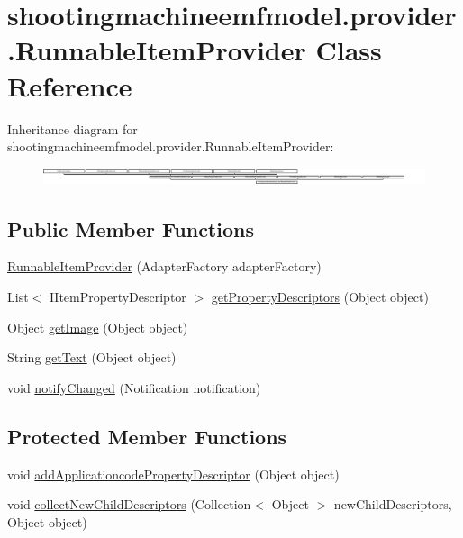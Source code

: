 \hypertarget{classshootingmachineemfmodel_1_1provider_1_1_runnable_item_provider}{\section{shootingmachineemfmodel.\-provider.\-Runnable\-Item\-Provider Class Reference}
\label{classshootingmachineemfmodel_1_1provider_1_1_runnable_item_provider}
}
Inheritance diagram for shootingmachineemfmodel.\-provider.\-Runnable\-Item\-Provider\-:\begin{figure}[H]
\begin{center}
\leavevmode
\includegraphics[height=0.499109cm]{classshootingmachineemfmodel_1_1provider_1_1_runnable_item_provider}
\end{center}
\end{figure}
\subsection*{Public Member Functions}
\begin{DoxyCompactItemize}
\item 
\hyperlink{classshootingmachineemfmodel_1_1provider_1_1_runnable_item_provider_a274fa6890fac2df2d340ad5b0453d7a5}{Runnable\-Item\-Provider} (Adapter\-Factory adapter\-Factory)
\item 
List$<$ I\-Item\-Property\-Descriptor $>$ \hyperlink{classshootingmachineemfmodel_1_1provider_1_1_runnable_item_provider_a06dd70c3a2446419402225c1147ad695}{get\-Property\-Descriptors} (Object object)
\item 
Object \hyperlink{classshootingmachineemfmodel_1_1provider_1_1_runnable_item_provider_afcff3702dbc71c659848e9c57c9934c0}{get\-Image} (Object object)
\item 
String \hyperlink{classshootingmachineemfmodel_1_1provider_1_1_runnable_item_provider_a2d29d74e5691074e28a7ff12b7ea0e9d}{get\-Text} (Object object)
\item 
void \hyperlink{classshootingmachineemfmodel_1_1provider_1_1_runnable_item_provider_a1debc0ff5839a93facc7544a38a58ff6}{notify\-Changed} (Notification notification)
\end{DoxyCompactItemize}
\subsection*{Protected Member Functions}
\begin{DoxyCompactItemize}
\item 
void \hyperlink{classshootingmachineemfmodel_1_1provider_1_1_runnable_item_provider_af2897af9cc7b9a33a0a957bdba4d2f0c}{add\-Applicationcode\-Property\-Descriptor} (Object object)
\item 
void \hyperlink{classshootingmachineemfmodel_1_1provider_1_1_runnable_item_provider_a992a8bf258bc5520cc33b0d6ebf6cc1d}{collect\-New\-Child\-Descriptors} (Collection$<$ Object $>$ new\-Child\-Descriptors, Object object)
\end{DoxyCompactItemize}


